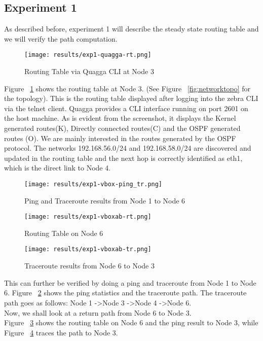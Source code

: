 \documentclass{article}
\begin{document}
\subsection{Experiment 1}
As described before, experiment 1 will describe the steady state routing table and we will verify the path
computation.\\
\begin{figure}[ht!]
  \centering
  \texttt{[image: results/exp1-quagga-rt.png]}
  \caption{Routing Table via Quagga CLI at Node 3}
  \label{fig:exp1-quagga-rt}
\end{figure}
Figure~ \ref{fig:exp1-quagga-rt} shows the routing table at Node 3. (See Figure~ \ref{fig:networktopo} for the topology).
This is the routing table displayed after logging into the zebra CLI via the telnet client.
Quagga provides a CLI interface running on port 2601 on the host machine.
As is evident from the screenshot, it displays the Kernel generated routes(K), Directly connected routes(C)
and the OSPF generated routes (O). We are mainly interested in the routes generated by the OSPF protocol.
The networks 192.168.56.0/24 and 192.168.58.0/24 are discovered and updated in the routing table and the 
next hop is correctly identified as eth1, which is the direct link to Node 4.\\
\begin{figure}[ht!]
  \centering
  \texttt{[image: results/exp1-vbox-ping\_tr.png]}
  \caption{Ping and Traceroute results from Node 1 to Node 6}
  \label{fig:exp1-vbox-ping_tr}
\end{figure}
\begin{figure}[ht!]
  \centering
  \texttt{[image: results/exp1-vboxab-rt.png]}
  \caption{Routing Table on Node 6}
  \label{fig:exp1-vboxab-rt}
\end{figure}
\begin{figure}[ht!]
  \centering
  \texttt{[image: results/exp1-vboxab-tr.png]}
  \caption{Traceroute results from Node 6 to Node 3}
  \label{fig:exp1-vboxab-tr}
\end{figure}
This can further be verified by doing a ping and traceroute from Node 1 to Node 6. 
Figure~ \ref{fig:exp1-vbox-ping_tr} shows the ping statistics and the traceroute path. The traceroute 
path goes as follows: Node 1 -\textgreater Node 3 -\textgreater  Node 4 -\textgreater  Node 6.\\
Now, we shall look at a return path from Node 6 to Node 3.\\
Figure~ \ref{fig:exp1-vboxab-rt} shows the routing table on Node 6 and the ping result to Node 3,
while Figure~ \ref{fig:exp1-vboxab-tr} traces the path to Node 3.
\end{document}
